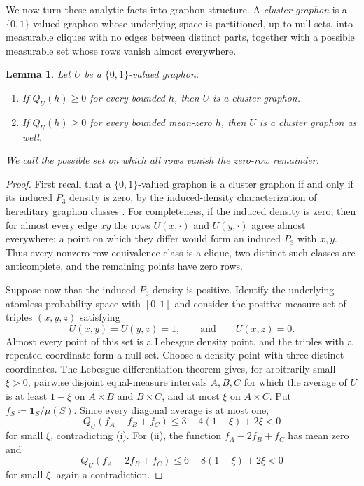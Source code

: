 \documentclass[10pt]{article}
\numberwithin{equation}{section}
\newtheorem{lemma}[lemma]{Lemma}
\newcommand{\one}{\mathbf 1}
\begin{document}
We now turn these analytic facts into graphon structure.  A \emph{cluster graphon} is a $\{0,1\}$-valued graphon whose underlying space is partitioned, up to null sets, into measurable cliques with no edges between distinct parts, together with a possible measurable set whose rows vanish almost everywhere.

\begin{lemma}\label{lem:PSD-cluster}
Let $U$ be a $\{0,1\}$-valued graphon.
\begin{enumerate}[label=\textup{(\roman*)}]
\item If $Q_U(h)\ge0$ for every bounded $h$, then $U$ is a cluster graphon.
\item If $Q_U(h)\ge0$ for every bounded mean-zero $h$, then $U$ is a cluster graphon as well.
\end{enumerate}
We call the possible set on which all rows vanish the \emph{zero-row remainder}.
\end{lemma}

\begin{proof}
First recall that a $\{0,1\}$-valued graphon is a cluster graphon if and only if its induced $P_3$ density is zero, by the induced-density characterization of hereditary graphon classes \cite{Lovasz}.  For completeness, if the induced density is zero, then for almost every edge $xy$ the rows $U(x,\cdot)$ and $U(y,\cdot)$ agree almost everywhere: a point on which they differ would form an induced $P_3$ with $x,y$.  Thus every nonzero row-equivalence class is a clique, two distinct such classes are anticomplete, and the remaining points have zero rows.

Suppose now that the induced $P_3$ density is positive.  Identify the underlying atomless probability space with $[0,1]$ and consider the positive-measure set of triples $(x,y,z)$ satisfying
\[
 U(x,y)=U(y,z)=1,
 \qquad\text{and}\qquad U(x,z)=0.
\]
Almost every point of this set is a Lebesgue density point, and the triples with a repeated coordinate form a null set.  Choose a density point with three distinct coordinates.  The Lebesgue differentiation theorem gives, for arbitrarily small $\xi>0$, pairwise disjoint equal-measure intervals $A,B,C$ for which the average of $U$ is at least $1-\xi$ on $A\times B$ and $B\times C$, and at most $\xi$ on $A\times C$.  Put $f_S\coloneqq\one_S/\mu(S)$.  Since every diagonal average is at most one,
\[
 Q_U(f_A-f_B+f_C)
 \le3-4(1-\xi)+2\xi<0
\]
for small $\xi$, contradicting \textup{(i)}.  For \textup{(ii)}, the function $f_A-2f_B+f_C$ has mean zero and
\[
 Q_U(f_A-2f_B+f_C)
 \le6-8(1-\xi)+2\xi<0
\]
for small $\xi$, again a contradiction.
\end{proof}
\end{document}
